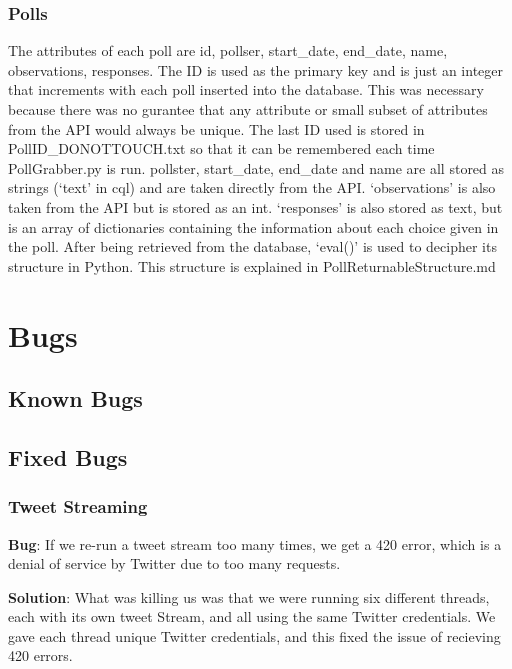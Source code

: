 \documentclass[letterpaper,12pt,english]{sphinxmanual}
\begin{document}
\subsubsection{\textbf{Polls}}
\label{schema:polls}
The attributes of each poll are id, pollser, start\_date, end\_date, name, observations, responses. The ID is used as the primary key and is just an integer that increments with each poll inserted into the database. This was necessary because there was no gurantee that any attribute or small subset of attributes from the API would always be unique. The last ID used is stored in PollID\_DONOTTOUCH.txt so that it can be remembered each time PollGrabber.py is run. pollster, start\_date, end\_date and name are all stored as strings (`text' in cql) and are taken directly from the API. `observations' is also taken from the API but is stored as an int. `responses' is also stored as text, but is an array of dictionaries containing the information about each choice given in the poll. After being retrieved from the database, `eval()' is used to decipher its structure in Python. This structure is explained in PollReturnableStructure.md


\section{Bugs}
\label{bugs::doc}\label{bugs:bugs}

\subsection{Known Bugs}
\label{currentbugs::doc}\label{currentbugs:known-bugs}

\subsection{Fixed Bugs}
\label{fixedbugs:fixed-bugs}\label{fixedbugs::doc}

\subsubsection{Tweet Streaming}
\label{fixedbugs:tweet-streaming}
\begin{DUlineblock}{0em}
\item[] \textbf{Bug}: If we re-run a tweet stream too many times, we get a 420 error, which is a denial of service by Twitter due to too many requests.
\end{DUlineblock}

\begin{DUlineblock}{0em}
\item[] \textbf{Solution}: What was killing us was that we were running six different threads, each with its own tweet Stream, and all using the same Twitter credentials. We gave each thread unique Twitter credentials, and this fixed the issue of recieving 420 errors.
\end{DUlineblock}
\end{document}
